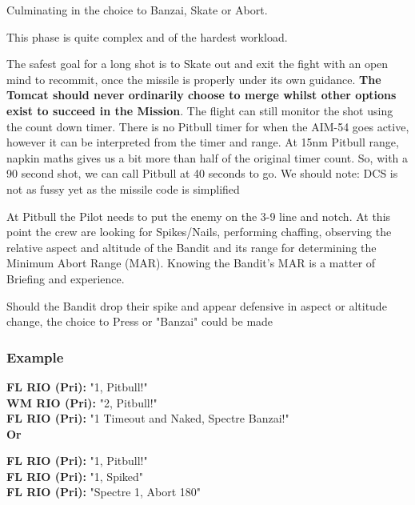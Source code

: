 Culminating in the choice to Banzai, Skate or Abort.

This phase is quite complex and of the hardest workload.


The safest goal for a long shot is to Skate out and exit the fight with an open
mind to recommit, once the missile is properly under its own guidance.
\textbf{The Tomcat should never ordinarily choose to merge whilst other options
exist to succeed in the Mission}. The flight can still monitor the shot using
the count down timer. There is no Pitbull timer for when the AIM-54 goes
active, however it can be interpreted from the timer and range. At 15nm Pitbull
range, napkin maths gives us a bit more than half of the original timer count.
So, with a 90 second shot, we can call Pitbull at 40 seconds to go. We should
note: DCS is not as fussy yet as the missile code is simplified

At Pitbull the Pilot needs to put the enemy on the 3-9 line and notch. At this
point the crew are looking for Spikes/Nails, performing chaffing, observing the
relative aspect and altitude of the Bandit and its range for determining the
Minimum Abort Range (MAR). Knowing the Bandit's MAR is a matter of Briefing and
experience.

Should the Bandit drop their spike and appear defensive in aspect or altitude
change, the choice to Press or "Banzai" could be made


\subsubsection*{Example}


\textbf{FL RIO (Pri):} "1, Pitbull!"\\
\textbf{WM RIO (Pri):} "2, Pitbull!"\\
\textbf{FL RIO (Pri):} "1 Timeout and Naked, Spectre Banzai!"\\

\textbf{Or}

\textbf{FL RIO (Pri):} "1, Pitbull!"\\
\textbf{FL RIO (Pri):} "1, Spiked"\\
\textbf{FL RIO (Pri):} "Spectre 1, Abort 180"\\

